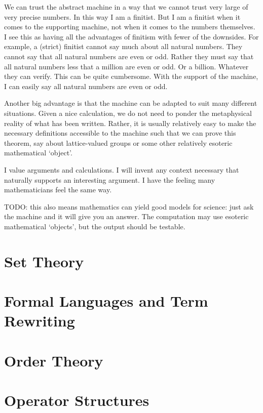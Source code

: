 \documentclass{report}
\begin{document}
We can trust the abstract machine in a way that we cannot trust very large of very precise numbers. In this way I am a finitist. But I am a finitist when it comes to the supporting machine, not when it comes to the numbers themselves. I see this as having all the advantages of finitism with fewer of the downsides. For example, a (strict) finitist cannot say much about all natural numbers. They cannot say that all natural numbers are even or odd. Rather they must say that all natural numbers less that a million are even or odd. Or a billion. Whatever they can verify. This can be quite cumbersome. With the support of the machine, I can easily say all natural numbers are even or odd.

Another big advantage is that the machine can be adapted to suit many different situations. Given a nice calculation, we do not need to ponder the metaphysical reality of what has been written. Rather, it is usually relatively easy to make the necessary definitions accessible to the machine such that we can prove this theorem, say about lattice-valued groups or some other relatively esoteric mathematical `object'.

I value arguments and calculations. I will invent any context necessary that naturally supports an interesting argument. I have the feeling many mathematicians feel the same way.

TODO: this also means mathematics can yield good models for science: just ask the machine and it will give you an answer. The computation may use esoteric mathematical `objects', but the output should be testable.

\part{Set Theory}
\setcounter{chapter}{0} %



\part{Formal Languages and Term Rewriting}
\setcounter{chapter}{0} %


\part{Order Theory}
\setcounter{chapter}{0} %


\part{Operator Structures}
\setcounter{chapter}{0} %

\end{document}
